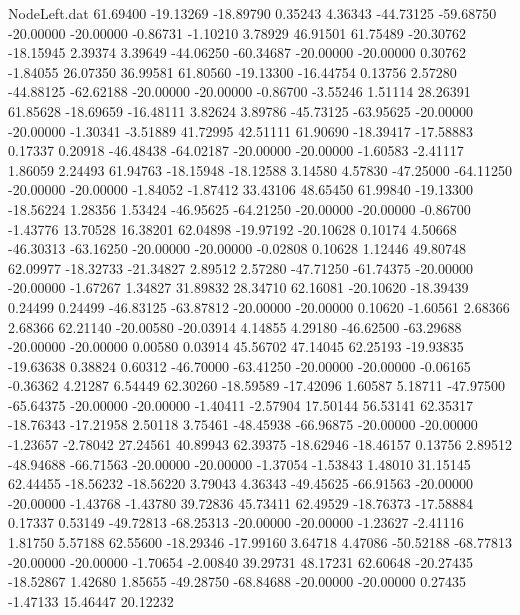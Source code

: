 \begin{filecontents}{NodeLeft.dat}
  61.69400  -19.13269  -18.89790     0.35243    4.36343  -44.73125  -59.68750  -20.00000  -20.00000   -0.86731   -1.10210    3.78929   46.91501
  61.75489  -20.30762  -18.15945     2.39374    3.39649  -44.06250  -60.34687  -20.00000  -20.00000    0.30762   -1.84055   26.07350   36.99581
  61.80560  -19.13300  -16.44754     0.13756    2.57280  -44.88125  -62.62188  -20.00000  -20.00000   -0.86700   -3.55246    1.51114   28.26391
  61.85628  -18.69659  -16.48111     3.82624    3.89786  -45.73125  -63.95625  -20.00000  -20.00000   -1.30341   -3.51889   41.72995   42.51111
  61.90690  -18.39417  -17.58883     0.17337    0.20918  -46.48438  -64.02187  -20.00000  -20.00000   -1.60583   -2.41117    1.86059    2.24493
  61.94763  -18.15948  -18.12588     3.14580    4.57830  -47.25000  -64.11250  -20.00000  -20.00000   -1.84052   -1.87412   33.43106   48.65450
  61.99840  -19.13300  -18.56224     1.28356    1.53424  -46.95625  -64.21250  -20.00000  -20.00000   -0.86700   -1.43776   13.70528   16.38201
  62.04898  -19.97192  -20.10628     0.10174    4.50668  -46.30313  -63.16250  -20.00000  -20.00000   -0.02808    0.10628    1.12446   49.80748
  62.09977  -18.32733  -21.34827     2.89512    2.57280  -47.71250  -61.74375  -20.00000  -20.00000   -1.67267    1.34827   31.89832   28.34710
  62.16081  -20.10620  -18.39439     0.24499    0.24499  -46.83125  -63.87812  -20.00000  -20.00000    0.10620   -1.60561    2.68366    2.68366
  62.21140  -20.00580  -20.03914     4.14855    4.29180  -46.62500  -63.29688  -20.00000  -20.00000    0.00580    0.03914   45.56702   47.14045
  62.25193  -19.93835  -19.63638     0.38824    0.60312  -46.70000  -63.41250  -20.00000  -20.00000   -0.06165   -0.36362    4.21287    6.54449
  62.30260  -18.59589  -17.42096     1.60587    5.18711  -47.97500  -65.64375  -20.00000  -20.00000   -1.40411   -2.57904   17.50144   56.53141
  62.35317  -18.76343  -17.21958     2.50118    3.75461  -48.45938  -66.96875  -20.00000  -20.00000   -1.23657   -2.78042   27.24561   40.89943
  62.39375  -18.62946  -18.46157     0.13756    2.89512  -48.94688  -66.71563  -20.00000  -20.00000   -1.37054   -1.53843    1.48010   31.15145
  62.44455  -18.56232  -18.56220     3.79043    4.36343  -49.45625  -66.91563  -20.00000  -20.00000   -1.43768   -1.43780   39.72836   45.73411
  62.49529  -18.76373  -17.58884     0.17337    0.53149  -49.72813  -68.25313  -20.00000  -20.00000   -1.23627   -2.41116    1.81750    5.57188
  62.55600  -18.29346  -17.99160     3.64718    4.47086  -50.52188  -68.77813  -20.00000  -20.00000   -1.70654   -2.00840   39.29731   48.17231
  62.60648  -20.27435  -18.52867     1.42680    1.85655  -49.28750  -68.84688  -20.00000  -20.00000    0.27435   -1.47133   15.46447   20.12232

\end{filecontents}
